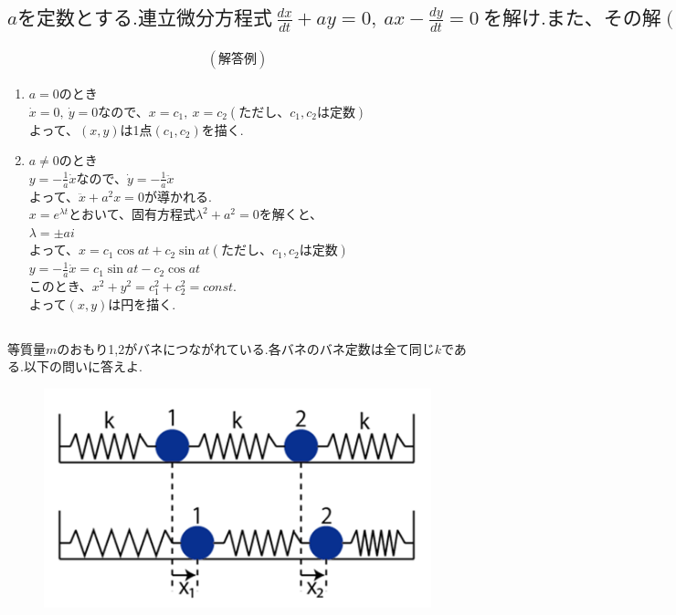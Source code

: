 \documentclass[a4paper,11pt,fleqn]{jarticle}
\begin{document}
\newpage
\subsection{$aを定数とする.連立微分方程式~\frac{dx}{dt}+ay=0,~ax-\frac{dy}{dt}=0~を解け.また、その解(x,y)はどんな図形を描くか.$}
\begin{eqnarray*}
(解答例)
\end{eqnarray*}
\begin{enumerate}
\item $a=0$のとき\\
$\dot{x}=0,~\dot{y}=0$なので、$x=c_1,~x=c_2(ただし、c_1,c_2は定数)$\\
よって、$(x,y)$は1点$(c_1,c_2)$を描く.
\item $a\neq 0$のとき\\
$y=-\frac{1}{a}\dot{x}$なので、$\dot{y}=-\frac{1}{a}\ddot{x}$\\
よって、$\ddot{x}+a^2x=0$が導かれる.\\
$x=e^{\lambda t}$とおいて、固有方程式${\lambda}^2+a^2=0$を解くと、\\
$\lambda =\pm ai$\\
よって、$x=c_1\cos at+c_2\sin at(ただし、c_1,c_2は定数)$\\
$y=-\frac{1}{a}\dot{x}=c_1\sin at-c_2\cos at$\\
このとき、$x^2+y^2=c_1^2+c_2^2=const.$\\
よって$(x,y)$は円を描く.
\end{enumerate}


\newpage
\subsection{}
等質量$m$のおもり1,2がバネにつながれている.各バネのバネ定数は全て同じ$k$である.以下の問いに答えよ.
\begin{figure}[htpb]
\begin{center}
\includegraphics[scale=.25]{bane.png}
\end{center}
\end{figure}
\end{document}
